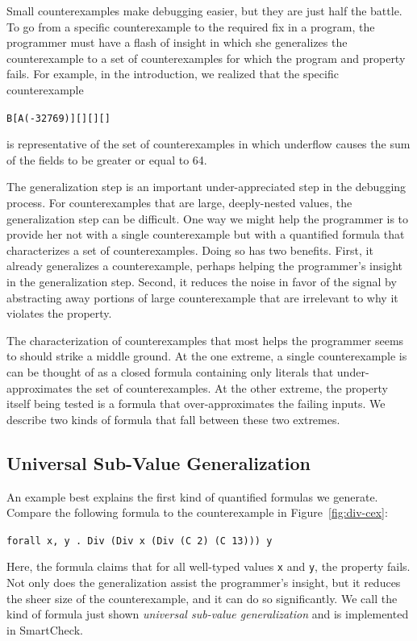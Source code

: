 \documentclass[10pt]{sigplanconf}
\newenvironment{code}{\begin{alltt}}{\end{alltt}}
\newcommand{\ttp}[1]{\texttt{#1}}
\begin{document}
Small counterexamples make debugging easier, but they are just half the battle.
To go from a specific counterexample to the required fix in a program, the
programmer must have a flash of insight in which she generalizes the
counterexample to a set of counterexamples for which the program and property
fails.  For example, in the introduction, we realized that the specific
counterexample
%
\begin{code}
B [A (-32769)] [] [] []
\end{code}
%
\noindent
is representative of the set of counterexamples in which underflow causes the
sum of the fields to be greater or equal to 64.

The generalization step is an important under-appreciated step in the debugging
process.  For counterexamples that are large, deeply-nested values, the
generalization step can be difficult.  One way we might help the programmer is
to provide her not with a single counterexample but with a quantified formula
that characterizes a set of counterexamples.  Doing so has two benefits.  First,
it already generalizes a counterexample, perhaps helping the programmer's
insight in the generalization step.  Second, it reduces the noise in favor of
the signal by abstracting away portions of large counterexample that are
irrelevant to why it violates the property.

The characterization of counterexamples that most helps the programmer seems to
should strike a middle ground.  At the one extreme, a single counterexample is
can be thought of as a closed formula containing only literals that
under-approximates the set of counterexamples.  At the other extreme, the
property itself being tested is a formula that over-approximates the failing
inputs.  We describe two kinds of formula that fall between these two extremes.

\subsection{Universal Sub-Value Generalization}
An example best explains the first kind of quantified formulas we generate.
Compare the following formula to the counterexample in Figure~\ref{fig:div-cex}:
%
\begin{code}
\ttp{forall x, y . Div (Div x (Div (C 2) (C 13))) y}
\end{code}
%
\noindent
Here, the formula claims that for all well-typed values \ttp{x} and \ttp{y}, the
property fails.  Not only does the generalization assist the programmer's
insight, but it reduces the sheer size of the counterexample, and it can do so
significantly.  We call the kind of formula just shown \emph{universal sub-value
  generalization} and is implemented in SmartCheck.
\end{document}
